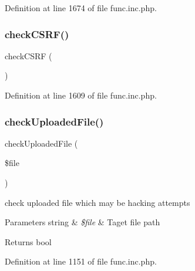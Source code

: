 Definition at line 1674 of file func.\+inc.\+php.

\mbox{\label{func_8inc_8php_a887fd7fe841f5dac3179296ae770172a}} 
\subsubsection{\texorpdfstring{check\+C\+S\+R\+F()}{checkCSRF()}}
{\footnotesize\ttfamily check\+C\+S\+RF (\begin{DoxyParamCaption}{ }\end{DoxyParamCaption})}



Definition at line 1609 of file func.\+inc.\+php.

\mbox{\label{func_8inc_8php_a771c122bb7a5b7038f7f751f5e2129b9}} 
\subsubsection{\texorpdfstring{check\+Uploaded\+File()}{checkUploadedFile()}}
{\footnotesize\ttfamily check\+Uploaded\+File (\begin{DoxyParamCaption}\item[{}]{\$file }\end{DoxyParamCaption})}

check uploaded file which may be hacking attempts


\begin{DoxyParams}[1]{Parameters}
string & {\em \$file} & Taget file path \\
\hline
\end{DoxyParams}
\begin{DoxyReturn}{Returns}
bool 
\end{DoxyReturn}


Definition at line 1151 of file func.\+inc.\+php.

\mbox{\label{func_8inc_8php_a56536fb66de4e320aaac07b82e6c2e21}} 
